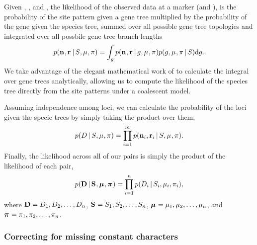 Given \murate, \gfreq, \comparisondivtime and \comparisonpopsizes, the
likelihood of the observed data at a marker (\allelecount and \redallelecount),
is the probability of the site pattern given a gene tree multiplied by the
probability of the gene given the species tree, summed over all possible gene
tree topologies and integrated over all possbile gene tree branch lengths
\begin{equation}
    \pr(\leafallelecounts, \leafredallelecounts \given \sptree, \murate, \gfreq)
    =
    \int_{\genetree}
    \pr(\leafallelecounts, \leafredallelecounts \given \genetree, \murate, \gfreq)
    \pr(\genetree, \murate, \gfreq \given \sptree)
    \diff{\genetree}.
    \label{eq:markerlikelihood}
\end{equation}
We take advantage of the elegant mathematical work of \citep{Bryant2012} to
calculate the integral over gene trees analytically, allowing us to compute the
likelihood of the species tree directly from the site patterns under a
coalescent model.

Assuming independence among loci, we can calculate the probability of the
\nloci loci given the specie trees by simply taking the product over them,
\begin{equation}
    \pr(\comparisondata \given \sptree, \murate, \gfreq)
    =
    \prod_{i=1}^{\nloci}
    \pr(\leafallelecounts[i], \leafredallelecounts[i] \given \sptree, \murate, \gfreq).
    \label{eq:comparisonlikelihood}
\end{equation}
Finally, the likelihood across all of our pairs is simply the product of the
likelihood of each pair,
\begin{equation}
    \pr(
    \alldata
    \given
    \sptrees,
    \murates,
    \gfreqs)
    =
    \prod_{i=1}^{\ncomparisons}
    \pr(\comparisondata[i] \given \sptree[i], \murate[i], \gfreq[i]),
    \label{eq:collectionlikelihood}
\end{equation}
where
$\alldata = \comparisondata[1], \comparisondata[2], \ldots, \comparisondata[\ncomparisons]$,
$\sptrees = \sptree[1], \sptree[2], \ldots, \sptree[\ncomparisons]$,
$\murates = \murate[1], \murate[2], \ldots, \murate[\ncomparisons]$,
and
$\gfreqs = \gfreq[1], \gfreq[2], \ldots, \gfreq[\ncomparisons]$.


\subsubsection{Correcting for missing constant characters}

